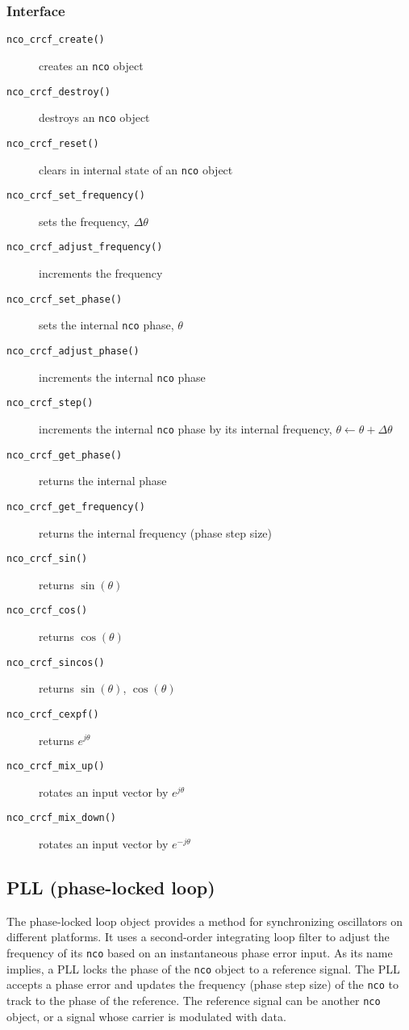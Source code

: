 \subsubsection{Interface}
\begin{description}
\item[{\tt nco\_crcf\_create()}] creates an {\tt nco} object
\item[{\tt nco\_crcf\_destroy()}] destroys an {\tt nco} object
\item[{\tt nco\_crcf\_reset()}] clears in internal state of an {\tt nco} object
\item[{\tt nco\_crcf\_set\_frequency()}] sets the frequency, $\Delta\theta$
\item[{\tt nco\_crcf\_adjust\_frequency()}] increments the frequency
\item[{\tt nco\_crcf\_set\_phase()}] sets the internal {\tt nco} phase, $\theta$
\item[{\tt nco\_crcf\_adjust\_phase()}] increments the internal {\tt nco} phase
\item[{\tt nco\_crcf\_step()}] increments the internal {\tt nco} phase by its
    internal frequency, $\theta \leftarrow \theta + \Delta\theta$
\item[{\tt nco\_crcf\_get\_phase()}] returns the internal phase
\item[{\tt nco\_crcf\_get\_frequency()}] returns the internal frequency (phase step
    size)
\item[{\tt nco\_crcf\_sin()}] returns $\sin(\theta)$
\item[{\tt nco\_crcf\_cos()}] returns $\cos(\theta)$
\item[{\tt nco\_crcf\_sincos()}] returns $\sin(\theta)$, $\cos(\theta)$
\item[{\tt nco\_crcf\_cexpf()}] returns $e^{j\theta}$
\item[{\tt nco\_crcf\_mix\_up()}] rotates an input vector by $e^{j\theta}$
\item[{\tt nco\_crcf\_mix\_down()}] rotates an input vector by $e^{-j\theta}$
\end{description}

\subsection{PLL (phase-locked loop)}
\label{module:nco:pll}
The phase-locked loop object provides a method for synchronizing oscillators
on different platforms.
It uses a second-order integrating loop filter to adjust the frequency of its
{\tt nco} based on an instantaneous phase error input.
As its name implies, a PLL locks the phase of the {\tt nco} object to a
reference signal.
The PLL accepts a phase error and updates the frequency (phase step size) of
the {\tt nco} to track to the phase of the reference.
The reference signal can be another {\tt nco} object, or a signal whose
carrier is modulated with data.


